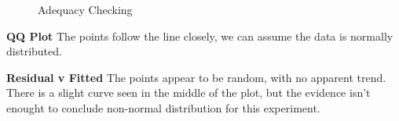 \documentclass{article}[12pt]
\begin{document}
                  \begin{figure}[htbp]
                    \centering
                    \hfill
                    \caption{Adequacy Checking}
                  \end{figure}

                  \textbf{QQ Plot} The points follow the line closely, we can assume the data is normally distributed.

                  \textbf{Residual v Fitted} The points appear to be random, with no apparent trend. There is a slight curve seen in the middle of the plot, but the evidence isn't enought to conclude non-normal distribution for this experiment.
\end{document}

